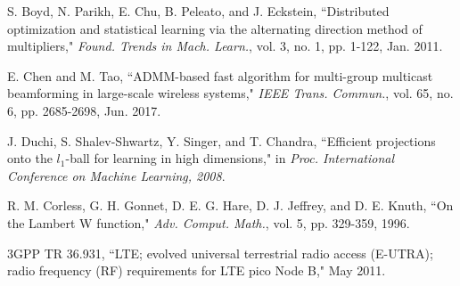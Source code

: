 \documentclass[journal]{IEEEtran}
\begin{document}
\begin{thebibliography}{1}
 S. Boyd, N. Parikh, E. Chu, B. Peleato, and J. Eckstein, ``Distributed optimization and statistical learning via the alternating direction method of multipliers," \emph{Found. Trends in Mach. Learn.}, vol. 3, no. 1, pp. 1-122, Jan. 2011.

 E. Chen and M. Tao, ``ADMM-based fast algorithm for multi-group multicast beamforming in large-scale wireless systems," \emph{IEEE Trans. Commun.}, vol. 65, no. 6, pp. 2685-2698, Jun. 2017.

 J. Duchi, S. Shalev-Shwartz, Y. Singer, and T. Chandra, ``Efficient projections onto the $l_1$-ball for learning in high dimensions," in \emph{Proc. International Conference on Machine Learning, 2008}.

 R. M. Corless, G. H. Gonnet, D. E. G. Hare, D. J. Jeffrey, and D. E. Knuth, ``On the Lambert W function," \emph{Adv. Comput. Math.}, vol. 5, pp. 329-359, 1996.
    
 3GPP TR 36.931, ``LTE; evolved universal terrestrial radio access (E-UTRA); radio frequency (RF) requirements for LTE pico Node B,"
    May 2011.
    
\end{thebibliography}
\end{document}
